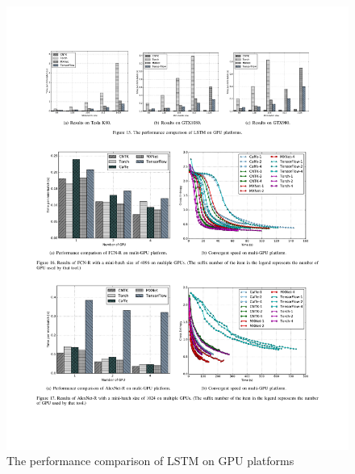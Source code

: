 \documentclass[11pt, oneside]{article}   	%
\begin{document}
\begin{figure}[htbp] 
	\includegraphics[width=\linewidth]{figures/LSTM2.pdf} 
	\caption{The performance comparison of LSTM on GPU platforms}
\end{figure}
%
\end{document}
